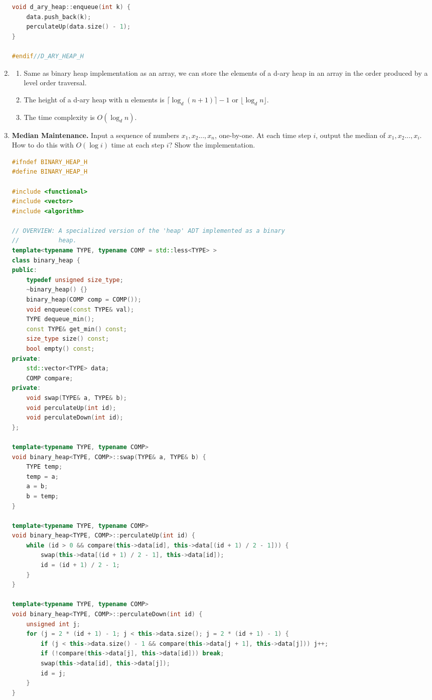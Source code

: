 \documentclass[12pt,a4paper]{article}
\makeatletter
\newtheorem*{solution}{Solution}
\theoremstyle{definition}
\renewenvironment{solution}[1][Solution] {\par\pushQED{\qed}\normalfont\topsep6\p@\@plus6\p@\relax\trivlist\item[\hskip\labelsep\bfseries#1\@addpunct{.}]\ignorespaces}{\popQED\endtrivlist\@endpefalse} \makeatother
\makeatother
\begin{document}
\begin{enumerate}
\begin{lstlisting}[language=C++]
void d_ary_heap::enqueue(int k) {
	data.push_back(k);
	perculateUp(data.size() - 1);
}

#endif//D_ARY_HEAP_H
\end{lstlisting}

\begin{solution}
\begin{enumerate}
\item
Same as binary heap implementation as an array, we can store the elements of a d-ary heap in an array in the order produced by a level order traversal.
\item
The height of a d-ary heap with n elements is $\lceil\log_d(n+1)\rceil-1$ or $\lfloor\log_dn\rfloor$.
\item
The time complexity is $O(\log_dn)$.
\end{enumerate}
\end{solution}

\item \textbf{Median Maintenance.} Input a sequence of numbers $x_1,x_2...,x_n$, one-by-one. At each time step $i$, output the median of $x_1,x_2...,x_i$. How to do this with $O(\log i)$ time at each step $i$? Show the implementation.

\begin{lstlisting}[language=C++]
#ifndef BINARY_HEAP_H
#define BINARY_HEAP_H

#include <functional>
#include <vector>
#include <algorithm>

// OVERVIEW: A specialized version of the 'heap' ADT implemented as a binary
//           heap.
template<typename TYPE, typename COMP = std::less<TYPE> >
class binary_heap {
public:
	typedef unsigned size_type;
	~binary_heap() {}
	binary_heap(COMP comp = COMP());
	void enqueue(const TYPE& val);
	TYPE dequeue_min();
	const TYPE& get_min() const;
	size_type size() const;
	bool empty() const;
private:
	std::vector<TYPE> data;
	COMP compare;
private:
	void swap(TYPE& a, TYPE& b);
	void perculateUp(int id);
	void perculateDown(int id);
};

template<typename TYPE, typename COMP>
void binary_heap<TYPE, COMP>::swap(TYPE& a, TYPE& b) {
	TYPE temp;
	temp = a;
	a = b;
	b = temp;
}

template<typename TYPE, typename COMP>
void binary_heap<TYPE, COMP>::perculateUp(int id) {
	while (id > 0 && compare(this->data[id], this->data[(id + 1) / 2 - 1])) {
		swap(this->data[(id + 1) / 2 - 1], this->data[id]);
		id = (id + 1) / 2 - 1;
	}
}

template<typename TYPE, typename COMP>
void binary_heap<TYPE, COMP>::perculateDown(int id) {
	unsigned int j;
	for (j = 2 * (id + 1) - 1; j < this->data.size(); j = 2 * (id + 1) - 1) {
		if (j < this->data.size() - 1 && compare(this->data[j + 1], this->data[j])) j++;
		if (!compare(this->data[j], this->data[id])) break;
		swap(this->data[id], this->data[j]);
		id = j;
	}
}


\end{lstlisting}
\end{enumerate}
\end{document}
